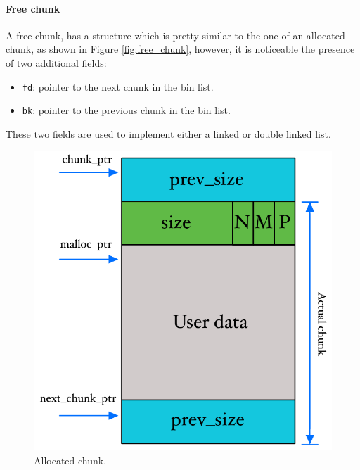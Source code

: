 \documentclass{article}
\numberwithin{equation}{subsection}
\begin{document}
\paragraph{Free chunk}
A free chunk, has a structure which is pretty similar to the one of an allocated chunk, as shown in Figure \ref{fig:free_chunk}, however, it is noticeable the presence of two additional fields:
\begin{itemize}
    \item \texttt{fd}: pointer to the next chunk in the bin list.
    \item \texttt{bk}: pointer to the previous chunk in the bin list.
\end{itemize}
These two fields are used to implement either a linked or double linked list.
\begin{figure}[H]
  \centering
  \begin{minipage}[b]{0.46\textwidth}
    \includegraphics[width=\textwidth]{allocated_chunk.pdf}
    \caption{Allocated chunk.}
    \label{fig:allocated_chunk}
  \end{minipage}
  \hfill
  \begin{minipage}[b]{0.5\textwidth}

\end{minipage}
\end{figure}
\end{document}
